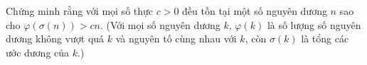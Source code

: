 \ifshowproblem
\begin{problem}\label{example:HUN-2015-TST-KMA-635}
    Chứng minh rằng với mọi số thực $c > 0$ đều tồn tại một số nguyên dương $n$ sao cho $\varphi(\sigma(n)) > cn$.  
    (Với mọi số nguyên dương $k$, $\varphi(k)$ là số lượng số nguyên dương không vượt quá $k$ và nguyên tố cùng nhau với $k$,
    còn $\sigma(k)$ là tổng các ước dương của $k$.)
\end{problem}
\fi

\fi